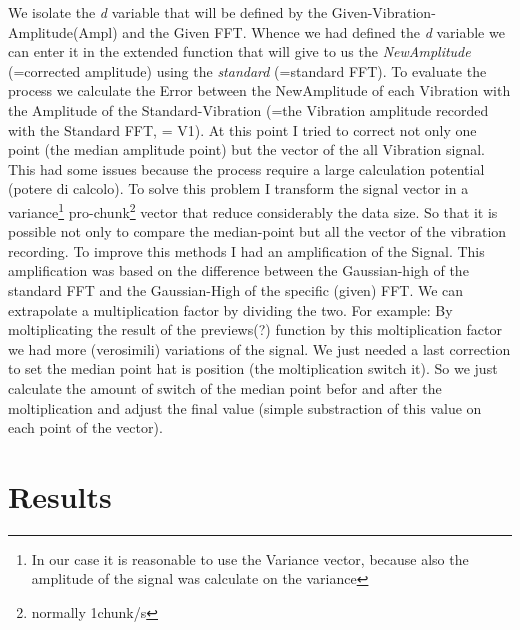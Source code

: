 \documentclass[11pt, a4paper]{article}
\begin{document}
We isolate the \textit{d} variable that will be defined by the Given-Vibration-Amplitude(Ampl) and the Given FFT. Whence we had defined the \textit{d} variable we can enter it in the extended function that will give to us the \textit{NewAmplitude} (=corrected amplitude) using the \textit{standard} (=standard FFT). To evaluate the process we calculate the Error between the NewAmplitude of each Vibration with the Amplitude of the Standard-Vibration (=the Vibration amplitude recorded with the Standard FFT, = V1).
At this point I tried to correct not only one point (the median amplitude point) but the vector of the all Vibration signal. This had some  issues because the process require a large calculation potential (potere di calcolo). To solve this problem I transform the signal vector in a variance\footnote{In our case it is reasonable to use the Variance vector, because also the amplitude of the signal was calculate on the variance} pro-chunk\footnote{normally 1chunk/s} vector that reduce considerably the data size. So that it is possible not only to compare the median-point but all the vector of the vibration recording. 
To improve this methods I had an amplification of the Signal. This amplification was based on the difference between the Gaussian-high of the standard FFT and the Gaussian-High of the specific (given) FFT. We can extrapolate a multiplication factor by dividing the two. For example: 
By moltiplicating the result of the previews(?) function by this moltiplication factor we had more (verosimili) variations of the signal. We just needed a last correction to set the median point hat is position (the moltiplication switch it). So we just calculate the amount of switch of the median point befor and after the moltiplication and adjust the final value (simple substraction of this value on each point of the vector).%



\section{Results}
\end{document}
